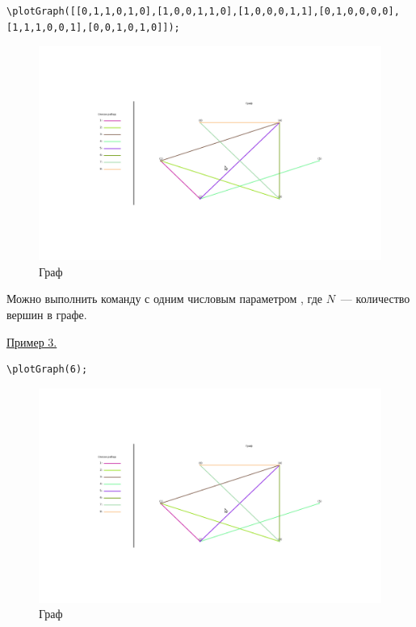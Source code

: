 \vspace*{-2mm}%
\begin{verbatim}
\plotGraph([[0,1,1,0,1,0],[1,0,0,1,1,0],[1,0,0,0,1,1],[0,1,0,0,0,0],
[1,1,1,0,0,1],[0,0,1,0,1,0]]);
\end{verbatim}
\begin{figure}[!ht]
 \includegraphics[scale=0.4]{pictures/4_2}
\caption{Граф}
\label{4_2}
\end{figure}

Можно выполнить команду с одним числовым параметром 
, 
где $N$~--- количество вершин в графе.

\underline{Пример 3. }

\vspace*{-2mm}%
\begin{verbatim}
\plotGraph(6);
\end{verbatim}
\begin{figure}[!ht]
 \includegraphics[scale=0.4]{pictures/4_2}
\caption{Граф}
\label{4_3}
\end{figure}


